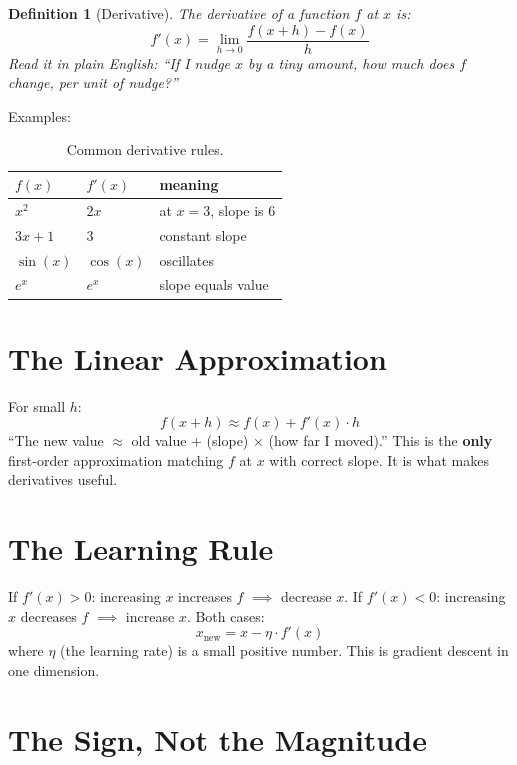 \documentclass[11pt,a4paper]{book}
\newtheorem{definition}{Definition}[chapter]
\begin{document}
\begin{definition}[Derivative]
The derivative of a function $f$ at $x$ is:
\begin{equation}\label{eq:deriv_def}
    f'(x) = \lim_{h \to 0} \frac{f(x+h) - f(x)}{h}
\end{equation}
Read it in plain English: \textit{``If I nudge $x$ by a tiny amount, how much does $f$ change, per unit of nudge?''}
\end{definition}

Examples:
\begin{table}[H]
\centering
\caption{Common derivative rules.}
\begin{tabular}{@{}lll@{}}
\toprule
$f(x)$ & $f'(x)$ & meaning \\
\midrule
$x^2$ & $2x$ & at $x=3$, slope is 6 \\
$3x+1$ & $3$ & constant slope \\
$\sin(x)$ & $\cos(x)$ & oscillates \\
$e^x$ & $e^x$ & slope equals value \\
\bottomrule
\end{tabular}
\end{table}

\section{The Linear Approximation}

For small $h$:
\begin{equation}\label{eq:linapprox}
    f(x + h) \approx f(x) + f'(x) \cdot h
\end{equation}
``The new value $\approx$ old value + (slope) $\times$ (how far I moved).''
This is the \textbf{only} first-order approximation matching $f$ at $x$ with correct slope. It is what makes derivatives useful.

\section{The Learning Rule}

If $f'(x) > 0$: increasing $x$ increases $f$ $\implies$ decrease $x$.
If $f'(x) < 0$: increasing $x$ decreases $f$ $\implies$ increase $x$.
Both cases:
\begin{equation}
    x_{\text{new}} = x - \eta \cdot f'(x)
\end{equation}
where $\eta$ (the learning rate) is a small positive number. This is gradient descent in one dimension.

\section{The Sign, Not the Magnitude}
\end{document}
